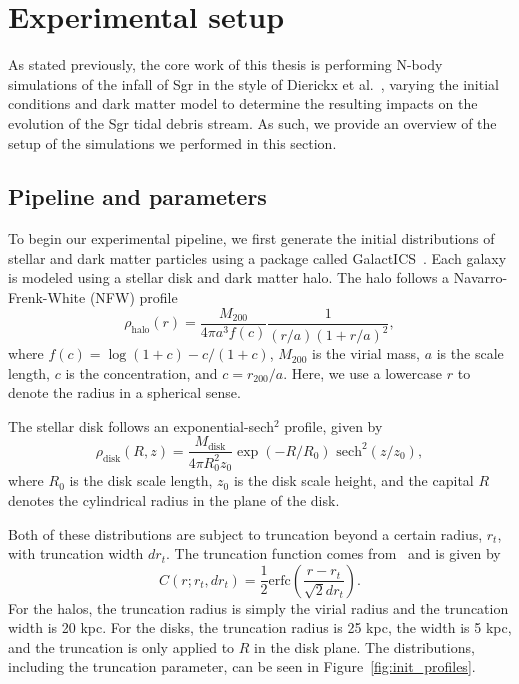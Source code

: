 \hypertarget{experimental-setup}{%
\chapter{Experimental setup}\label{experimental-setup}}

As stated previously, the core work of this thesis is performing N-body
simulations of the infall of Sgr in the style of Dierickx et
al.~\cite{dierickx_predicted_2017}, varying the initial conditions and dark
matter model to determine the resulting impacts on the evolution of the Sgr
tidal debris stream. As such, we provide an overview of the setup of the
simulations we performed in this section.

\hypertarget{pipeline-and-parameters}{%
\section{Pipeline and parameters}\label{pipeline-and-parameters}}

To begin our experimental pipeline, we first generate the initial
distributions of stellar and dark matter particles using a package called
GalactICS~\cite{deg_galactics_2019}. Each galaxy is modeled using a stellar
disk and dark matter halo. The halo follows a Navarro-Frenk-White (NFW)
profile
\begin{equation}
    \rho_{\text{halo}} (r) = 
    \frac{M_{200}}{4\pi a^3 f(c)} 
    \frac{1}{(r/a)(1+r/a)^2},
\end{equation}
where $f(c) = \log (1+c) - c/(1+c)$, $M_{200}$ is the virial mass, $a$ is the
scale length, $c$ is the concentration, and $c = r_{200} / a$. Here, we use a
lowercase $r$ to denote the radius in a spherical sense.

The stellar disk follows an exponential-sech$^2$ profile, given by
\begin{equation}
    \rho_{\text{disk}} (R, z) = 
    \frac{M_{\text{disk}}}{4 \pi R_0^2 z_0}
    \exp(-R/R_0) \text{ sech}^2(z/z_0),
\end{equation}
where $R_0$ is the disk scale length, $z_0$ is the disk scale height, and the
capital $R$ denotes the cylindrical radius in the plane of the disk.

Both of these distributions are subject to truncation beyond a certain
radius, \(r_t\), with truncation width \(dr_t\). The truncation function
comes from~\cite{widrow_dynamical_2008} and is given by
\begin{equation}
C(r; r_t, dr_t) = \frac{1}{2} \text{erfc} 
\left( \frac{r - r_t}{\sqrt{2} dr_t} \right).
\end{equation}
For the halos, the truncation radius is simply the virial radius and the
truncation width is 20 kpc. For the disks, the truncation radius is 25 kpc,
the width is 5 kpc, and the truncation is only applied to $R$ in the disk
plane. The distributions, including the truncation parameter, can be seen in
Figure~\ref{fig:init_profiles}.


